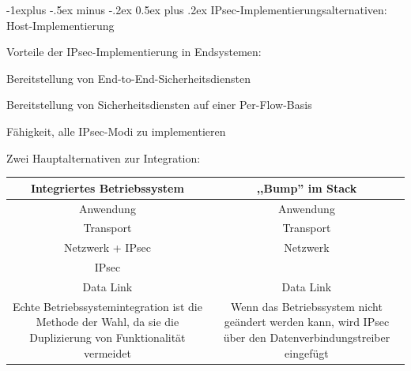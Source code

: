 \documentclass[a4paper]{article}
\makeatletter
\renewcommand{\subsection}{\@startsection{subsection}{2}{0mm}%
 {-1explus -.5ex minus -.2ex}%
 {0.5ex plus .2ex}%
 {\normalfont\normalsize\bfseries}}
\makeatother
\begin{document}
\begin{multicols}{3}
      \subsection{IPsec-Implementierungsalternativen: Host-Implementierung}
      \begin{itemize*}
            \item Vorteile der IPsec-Implementierung in Endsystemen:
            \begin{itemize*}
                  \item Bereitstellung von End-to-End-Sicherheitsdiensten
                  \item Bereitstellung von Sicherheitsdiensten auf einer Per-Flow-Basis
                  \item Fähigkeit, alle IPsec-Modi zu implementieren
            \end{itemize*}
            \item Zwei Hauptalternativen zur Integration:
      \end{itemize*}
      \begin{tabular}{c|c}
            Integriertes Betriebssystem & ,,Bump'' im Stack                                                                                         \\\hline
            Anwendung                   & Anwendung                                                                                                 \\
            Transport                   & Transport                                                                                                 \\
            Netzwerk + IPsec            & Netzwerk                                                                                                  \\
            IPsec                       &                                                                                                           \\
            Data Link                   & Data Link                                                                                                 \\
            Echte Betriebssystemintegration ist die Methode der Wahl, da sie die Duplizierung von Funktionalität
            vermeidet                   & Wenn das Betriebssystem nicht geändert werden kann, wird IPsec über den Datenverbindungstreiber eingefügt
      \end{tabular}


\end{multicols}
\end{document}

